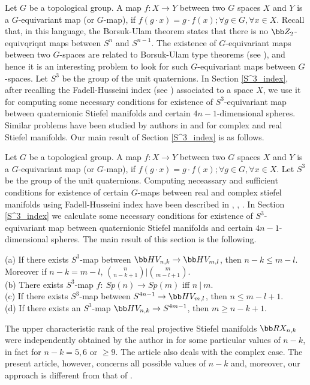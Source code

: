Let $G$ be a topological group. A map $f\colon X\to Y$ between two $G$ spaces $X$ and $Y$ is a $G$-equivariant map (or $G$-map), if $f(g\cdot x)=g\cdot f(x); \forall g\in G, \forall x\in X$. Recall that, in this language, the Borsuk-Ulam theorem states that there is no $\bb Z_2$-equivqriqnt maps between $S^n$ and $S^{n-1}$. The existence of $G$-equivariant maps between two $G$-spaces are related to Borsuk-Ulam type theorems (see \cite{FH1988}), and hence it is an interesting problem to look for such $G$-equivariant maps between $G$-spaces. Let $S^3$ be the group of the unit quaternions. In Section \ref{S^3_index}, after recalling the Fadell-Husseini index (see \cite{FH1988}) associated to a space $X$, we use it for computing some necessary conditions for existence of $S^3$-equivariant map between quaternionic Stiefel manifolds and certain $4n-1$-dimensional spheres. Similar problems have been studied by authors in \cite{PETROVIC2017} and \cite{BK21} for complex and real Stiefel manifolds. Our main result of Section \ref{S^3_index} is as follows. 




Let $G$ be a topological group. A map $f\colon X\to Y$ between two $G$ spaces $X$ and $Y$ is a $G$-equivariant map (or $G$-map), if $f(g\cdot x)=g\cdot f(x); \forall g\in G, \forall x\in X$. Let $S^3$ be the group of the unit quaternions. Computing neceassary and sufficient conditions for existence of certain $G$-maps between real and complex stiefel manifolds using Fadell-Husseini index have been described in \cite{Ha05}, \cite{Pe13}, \cite{BK21}.   In Section \ref{S^3_index} we calculate some necessary conditions for existence of $S^3$-equivariant map between quaternionic Stiefel manifolds and certain $4n-1$-dimensional spheres. The main result of this section is the following. 
\begin{Theorem}
(a) If there exists $S^3$-map between $\bb HV_{n,k}\to \bb HV_{m,l}$,  then $n-k\leq m-l$. Moreover if $n-k=m-l$, $\binom{n}{n-k+1}\vert \binom{m}{m-l+1}$.\\
 (b) There exists $S^3$-map $f:~Sp(n)\to Sp(m)$ iff $n~|~m$.\\
    (c) If there exists $S^3$-map between $ S^{4n-1}\to \bb HV_{m,l}$, then $n\leq m-l+1$.\\
    (d) If there exists an $S^3$-map $\bb HV_{n,k}\to  S^{4m-1}$, then $m\geq n-k+1$.
\end{Theorem}


The upper characteristic rank of the real projective Stiefel manifolds $\bb RX_{n, k}$ were independently obtained by the author in \cite{dasgupta2024} for some particular values of $n-k$, in fact for $n-k=5, 6$ or $\ge 9$. The article also deals with the complex case. The present article, however, concerns all possible values of $n-k$ and, moreover, our approach is different from that of \cite{dasgupta2024}.
